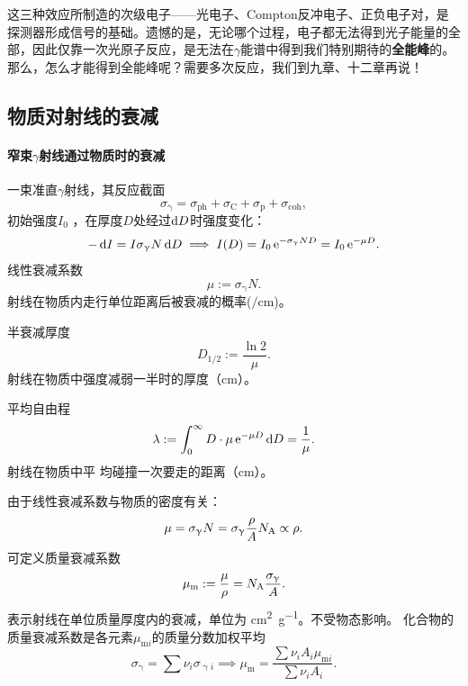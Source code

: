 这三种效应所制造的次级电子——光电子、Compton反冲电子、正负电子对，是探测器形成信号的基础。遗憾的是，无论哪个过程，电子都无法得到光子能量的全部，因此仅靠一次光原子反应，是无法在$\gamma$能谱中得到我们特别期待的\textbf{全能峰}的。
那么，怎么才能得到全能峰呢？需要多次反应，我们到九章、十二章再说！

\subsection{物质对\gammaray 射线的衰减}

\paragraph{窄束$\gamma$射线通过物质时的衰减}
一束准直$\gamma$射线，其反应截面
\begin{equation}\label{eq:nrd-photon-total-cross-section}
	\sigma_\upgamma = \sigma_{\mathrm{ph}} + \sigma_{\mathrm C} + \sigma_{\mathrm p} + \sigma_{\mathrm{coh}},
\end{equation}
初始强度$I_0$ ，在厚度$D$处经过$\mathop{}\!\mathrm{d} D$时强度变化：
\begin{equation}\label{eq:nrd-narrow-beam-attenuation}
	- \mathop{}\!\mathrm{d} I = I\sigma_\upgamma N\mathop{}\!\mathrm{d} D \implies I(D) = I_0\mathop{}\!\mathrm{e}^{-\sigma_\upgamma ND} = I_0\mathop{}\!\mathrm{e}^{-\mu D}.
\end{equation}
线性衰减系数
\begin{equation}\label{eq:nrd-linear-attenuation}
	\mu := \sigma_\upgamma N.
\end{equation}
射线在物质内走行单位距离后被衰减的概率($\unit{\per\centi\metre}$)。

半衰减厚度
\begin{equation}\label{eq:nrd-half-value-layer}
	D_{1/2} := \frac{\ln 2}\mu.
\end{equation}
射线在物质中强度减弱一半时的厚度（\unit{cm}）。


平均自由程
\begin{equation}\label{eq:nrd-photon-mean-free-path}
	\lambda := \int_0^\infty D \cdot \mu \mathop{}\!\mathrm{e}^{-\mu D}\mathop{}\!\mathrm{d} D = \frac1\mu.
\end{equation}
射线在物质中平
均碰撞一次要走的距离（\unit{cm}）。

由于线性衰减系数与物质的密度有关：
\[
	\mu = \sigma_\upgamma N = \sigma_\upgamma\frac\rho{A}N_{\mathrm{A}} \propto \rho.
\]
可定义质量衰减系数
\begin{align}
	\mu_\mathrm m := \frac\mu\rho = N_{\mathrm{A}}\frac{\sigma_\upgamma}A.
\end{align}
表示射线在单位质量厚度内的衰减，单位为 \unit{\centi\metre\squared\per\gram}。不受物态影响。
化合物的质量衰减系数是各元素$\mu_{\mathrm mi}$的质量分数加权平均
\begin{equation}\label{eq:nrd-mixture-mass-attenuation}
	\sigma_\upgamma = \sum\nu_i\sigma_{\upgamma i} \implies \mu_\mathrm m = \frac{\sum\nu_iA_i\mu_{\mathrm mi}}{\sum\nu_iA_i}.
\end{equation}

